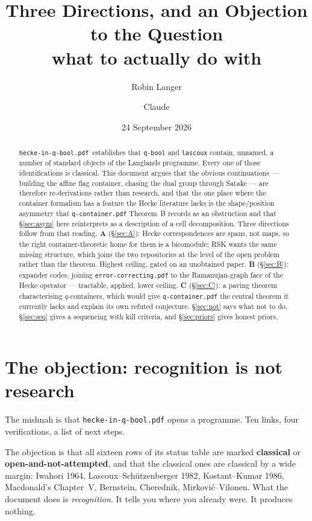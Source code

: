 \documentclass[11pt,a4paper]{article}
\title{\bfseries Three Directions, and an Objection to the Question\\[0.4em]
\large what to actually do with \HQB{}}
\author{Robin Langer \and Claude}
\date{24 September 2026}
\theoremstyle{definition}
\theoremstyle{remark}
\newcommand{\HQB}{\texttt{hecke-\allowbreak{}in-\allowbreak{}q-\allowbreak{}bool.pdf}}
\begin{document}
\maketitle

\begin{abstract}
\HQB\ establishes that \texttt{q-bool} and
\texttt{lascoux} contain, unnamed, a number of standard objects of the Langlands
programme. Every one of those identifications is classical. This document argues
that the obvious continuations --- building the affine flag container, chasing
the dual group through Satake --- are therefore re-derivations rather than
research, and that the one place where the container formalism has a feature the
Hecke literature lacks is the shape/position asymmetry that
\texttt{q-container.pdf} Theorem~B records as an obstruction and that
\S\ref{sec:asym} here reinterprets as a description of a cell decomposition.
Three directions follow from that reading. \textbf{A} (\S\ref{sec:A}):
Hecke correspondences are spans, not maps, so the right container-theoretic home
for them is a bicomodule; RSK wants the same missing structure, which joins the
two repositories at the level of the open problem rather than the theorem.
Highest ceiling, gated on an unobtained paper. \textbf{B} (\S\ref{sec:B}):
expander codes, joining \texttt{error-correcting.pdf} to the Ramanujan-graph face
of the Hecke operator --- tractable, applied, lower ceiling. \textbf{C}
(\S\ref{sec:C}): a paving theorem characterising $q$-containers, which would give
\texttt{q-container.pdf} the central theorem it currently lacks and explain its
own refuted conjecture. \S\ref{sec:not} says what not to do, \S\ref{sec:seq}
gives a sequencing with kill criteria, and \S\ref{sec:priors} gives honest
priors.
\end{abstract}

\section{The objection: recognition is not research}\label{sec:obj}

The mishnah is that \HQB{} opens a programme. Ten links,
four verifications, a list of next steps.

The objection is that all sixteen rows of its status table are marked
\textbf{classical} or \textbf{open-and-not-attempted}, and that the classical
ones are classical by a wide margin: Iwahori 1964, Lascoux--Sch\"utzenberger
1982, Kostant--Kumar 1986, Macdonald's Chapter~V, Bernstein, Cherednik,
Mirkovi\'c--Vilonen. What the document does is \emph{recognition}. It tells you
where you already were. It produces nothing.
\end{document}
